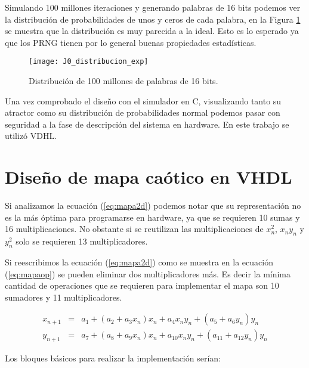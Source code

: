         Simulando 100 millones iteraciones y generando palabras de 16 bits podemos ver la distribución de probabilidades de unos y ceros de cada palabra, en la Figura \ref{fig:J0_distribucion_exp} se muestra que la distribución es muy parecida a la ideal. Esto es lo esperado ya que los PRNG tienen por lo general buenas propiedades estadísticas.

        \begin{figure}[hbtp]
            \caption{Distribución de 100 millones de palabras de 16 bits.}
            \centering
            \texttt{[image: J0\_distribucion\_exp]}
            \label{fig:J0_distribucion_exp}
        \end{figure}

        Una vez comprobado el diseño con el simulador en C, visualizando tanto su atractor como su distribución de probabilidades normal podemos pasar con seguridad a la fase de descripción del sistema en hardware. En este trabajo se utilizó VDHL.

    \section{Diseño de mapa caótico en VHDL}

        Si analizamos la ecuación (\ref{eq:mapa2d}) podemos notar que su representación no es la más óptima para programarse en hardware, ya que se requieren 10 sumas y 16 multiplicaciones. No obstante si se reutilizan las multiplicaciones de $x_{n}^{2}$, $x_{n}y_{n}$ y $y_{n}^{2}$ solo se requieren 13 multiplicadores.

        Si reescribimos la ecuación (\ref{eq:mapa2d}) como se muestra en la ecuación (\ref{eq:mapaop}) se pueden eliminar dos multiplicadores más. Es decir la mínima cantidad de operaciones que se requieren para implementar el mapa son 10 sumadores y 11 multiplicadores.

        \begin{equation}
            \begin{array}{ccl}
                x_{n+1} & = &  a_{1} + ( a_{2} + a_{3}x_{n} )x_{n} + a_{4}x_{n}y_{n} + ( a_{5} + a_{6}y_{n} )y_{n} \\
                y_{n+1} & = &  a_{7} + ( a_{8} + a_{9}x_{n} )x_{n} + a_{10}x_{n}y_{n} + ( a_{11} + a_{12}y_{n})y_{n}
            \end{array}
            \label{eq:mapaop}
        \end{equation}

        Los bloques básicos para realizar la implementación serían: 
            
